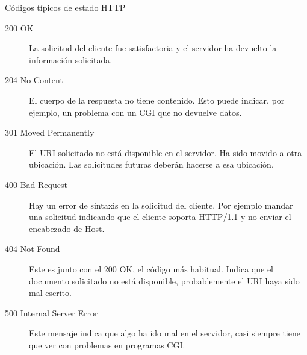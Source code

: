 \begin{frame}{Códigos típicos de estado HTTP} %

\begin{description}
   
\item[200 OK]	La solicitud del cliente fue satisfactoria y el servidor ha devuelto la información solicitada.
\item[204 No Content]	El cuerpo de la respuesta no tiene contenido. Esto puede indicar, por ejemplo, un problema con un CGI que no devuelve datos.
\item[301 Moved Permanently]	El URI solicitado no está disponible en el servidor. Ha sido movido a otra ubicación. Las solicitudes futuras deberán hacerse a esa ubicación.
\item[400 Bad Request]	Hay un error de sintaxis en la solicitud del cliente. Por ejemplo mandar una solicitud indicando que el cliente soporta HTTP/1.1 y no enviar el encabezado de Host.
\item[404 Not Found]	Este es junto con el 200 OK, el código más habitual. Indica que el documento solicitado no está disponible, probablemente el URI haya sido mal escrito.
\item[500 Internal Server Error]	Este mensaje indica que algo ha ido mal en el servidor, casi siempre tiene que ver con problemas en programas CGI.

\end{description}

\end{frame}



